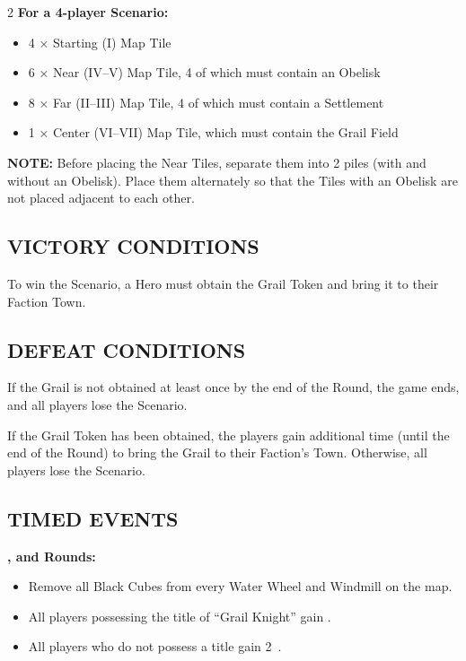\begin{multicols*}{2}
\textbf{For a 4-player Scenario:}
\begin{itemize}
  \item 4 × Starting (I) Map Tile
  \item 6 × Near (IV--V) Map Tile, 4 of which must contain an Obelisk
  \item 8 × Far (II--III) Map Tile, 4 of which must contain a Settlement
  \item 1 × Center (VI--VII) Map Tile, which must contain the Grail Field
\end{itemize}

\textbf{\MakeUppercase{Note:}} Before placing the Near Tiles, separate them into 2 piles (with and without an Obelisk). Place them alternately so that the Tiles with an Obelisk are not placed adjacent to each other.

\subsection*{\MakeUppercase{Victory Conditions}}
To win the Scenario, a Hero must obtain the Grail Token and bring it to their Faction Town.

\subsection*{\MakeUppercase{Defeat Conditions}}
If the Grail is not obtained at least once by the end of the  Round, the game ends, and all players lose the Scenario.

If the Grail Token has been obtained, the players gain additional time (until the end of the  Round) to bring the Grail to their Faction's Town. Otherwise, all players lose the Scenario.

\columnbreak
\subsection*{\MakeUppercase{Timed Events}}

\textbf{,  and  Rounds:}
\begin{itemize}
  \item Remove all Black Cubes from every Water Wheel and Windmill on the map.
  \item All players possessing the title of ``\textcolor{cobalt}{Grail Knight}'' gain .
  \item All players who do not possess a title gain 2~.
\end{itemize}


\end{multicols*}
